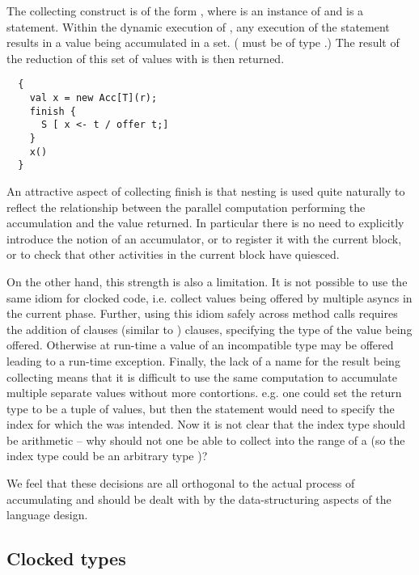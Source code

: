 The collecting  construct is of the form , where  is an instance of  and
 is a statement. Within the dynamic execution of , any
execution of the statement  results in a value 
being accumulated in a set. ( must be of type .) The
result of the reduction of this set of  values with 
is then returned.

\begin{lstlisting}
  {
    val x = new Acc[T](r);
    finish {
      S [ x <- t / offer t;]
    }
    x()
  }
\end{lstlisting}

An attractive aspect of collecting finish is that nesting is used
quite naturally to reflect the relationship between the parallel
computation performing the accumulation and the value returned. In
particular there is no need to explicitly introduce the notion of an
accumulator, or to register it with the current block, or to check
that other activities in the current block have quiesced.

On the other hand, this strength is also a limitation. It is not
possible to use the same idiom for clocked code, i.e.{} collect values
being offered by multiple  asyncs in the current phase.
Further, using this idiom safely across method calls requires the
addition of  clauses (similar to )
clauses, specifying the type of the value being offered. Otherwise at
run-time a value of an incompatible type may be offered leading to a
run-time exception. Finally, the lack of a name for the result being
collecting means that it is difficult to use the same computation to
accumulate multiple separate values without more contortions. e.g.{}
one could set the return type to be a tuple of values, but then the
 statement would need to specify the index for which the
 was intended. Now it is not clear that the index type
should be arithmetic -- why should not one be able to collect into the
range of a  (so the index type could be an arbitrary
type )?

We feel that these decisions are all orthogonal to the actual process
of accumulating and should be dealt with by the data-structuring
aspects of the language design.

\subsection{Clocked types}

